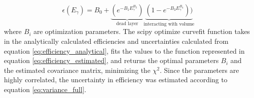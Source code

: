 \begin{equation} \label{eq:efficiency_estimated}
\epsilon(E_\gamma) =  B_0 + \underbrace{(e^{-B_1 E_\gamma^{B_2}})}_\text{dead layer}  \underbrace{(1-e^{-B_3 E_\gamma^{B_4}}))}_\text{interacting with volume} 
\end{equation}
\noindent 
where $B_i$ are optimization parameters. The scipy optimize curvefit function \cite{Virtanen2020} takes in the analytically calculated efficiencies and uncertainties calculated from equation \ref{eq:efficiency_analytical}, fits the values to the function represented in equation \ref{eq:efficiency_estimated}, and returns the optimal parameters $B_i$ and the estimated covariance matrix, minimizing the $\chi^2$. Since the parameters are highly correlated, the uncertainty in efficiency was estimated according to equation \ref{eq:variance_full}. %
